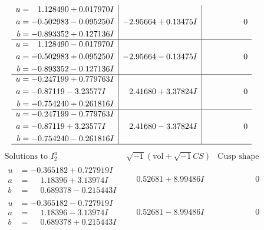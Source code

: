 \documentclass[1p]{elsarticle_modified}
\theoremstyle{definition}
\newcommand{\I}{\sqrt{-1}}
\begin{document}
$$\begin{array}{c|c|c}
\begin{aligned}
u &= \phantom{-}1.128490 + 0.017970 I \\
a &= -0.502983 - 0.095250 I \\
b &= -0.893352 + 0.127136 I\end{aligned}
 & -2.95664 + 0.13475 I & \phantom{-0.000000 } 0 \\ \hline\begin{aligned}
u &= \phantom{-}1.128490 - 0.017970 I \\
a &= -0.502983 + 0.095250 I \\
b &= -0.893352 - 0.127136 I\end{aligned}
 & -2.95664 - 0.13475 I & \phantom{-0.000000 } 0 \\ \hline\begin{aligned}
u &= -0.247199 + 0.779763 I \\
a &= -0.87119 - 3.23577 I \\
b &= -0.754240 + 0.261816 I\end{aligned}
 & \phantom{-}2.41680 + 3.37824 I & \phantom{-0.000000 } 0 \\ \hline\begin{aligned}
u &= -0.247199 - 0.779763 I \\
a &= -0.87119 + 3.23577 I \\
b &= -0.754240 - 0.261816 I\end{aligned}
 & \phantom{-}2.41680 - 3.37824 I & \phantom{-0.000000 } 0\\
 \hline 
 \end{array}$$\newpage$$\begin{array}{c|c|c}  
\text{Solutions to }I^u_{2}& \I (\text{vol} + \sqrt{-1}CS) & \text{Cusp shape}\\
 \hline 
\begin{aligned}
u &= -0.365182 + 0.727919 I \\
a &= \phantom{-}1.18396 + 3.13974 I \\
b &= \phantom{-}0.689378 - 0.215443 I\end{aligned}
 & \phantom{-}0.52681 + 8.99486 I & \phantom{-0.000000 } 0 \\ \hline\begin{aligned}
u &= -0.365182 - 0.727919 I \\
a &= \phantom{-}1.18396 - 3.13974 I \\
b &= \phantom{-}0.689378 + 0.215443 I\end{aligned}
 & \phantom{-}0.52681 - 8.99486 I & \phantom{-0.000000 } 0 \\ \hline\begin{aligned}

\end{aligned}
\end{array}$$
\end{document}
